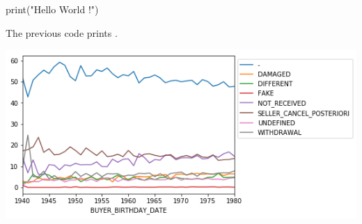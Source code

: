 \documentclass[ebook,10pt,oneside,openany,final, french]{memoir}
\begin{document}
\pagestyle{pageStyle}

\frontmatter


\mainmatter
\setglobalstyles


\begin{codeblock}
print("Hello World !")
\end{codeblock}

The previous code prints .

\begin{center}
  \includegraphics[scale=0.75]{assets/buyer-birthday-date-claim-percentage-crosstab}
\end{center}


\begin{appendices}
\end{appendices}


\backmatter

\end{document}
